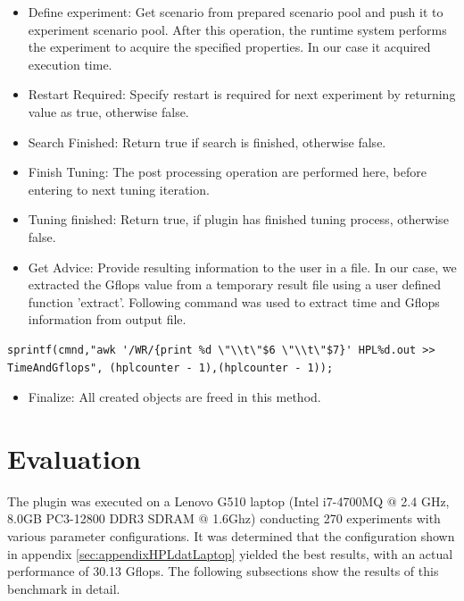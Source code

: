 \documentclass[10pt,twocolumn]{article}
\begin{document}
\begin{itemize}


\item Define experiment: Get scenario from prepared scenario pool and push it to experiment scenario pool. After this operation, the runtime system performs the experiment to acquire the specified properties. In our case it acquired execution time.

\item Restart Required: Specify restart is required for next experiment by returning value as true, otherwise false.

\item Search Finished: Return true if search is finished, otherwise false.

\item Finish Tuning: The post processing operation are performed here, before entering to next tuning iteration.

\item Tuning finished: Return true, if plugin has finished tuning process, otherwise false.

\item Get Advice: Provide resulting information to the user in a file. In our case, we extracted the Gflops value from a temporary result file using a user defined function 'extract'. Following command was used to extract time and Gflops information from output file.
\end{itemize}

\begin{lstlisting}
sprintf(cmnd,"awk '/WR/{print %d \"\\t\"$6 \"\\t\"$7}' HPL%d.out >> TimeAndGflops", (hplcounter - 1),(hplcounter - 1)); 
\end{lstlisting}

\begin{itemize}

\item Finalize: All created objects are freed in this method.

\end{itemize}


\section{Evaluation}
\label{sec:evaluation}
The plugin was executed on a Lenovo G510 laptop (Intel i7-4700MQ $@$ 2.4 GHz, 8.0GB PC3-12800 DDR3 SDRAM $@$ 1.6Ghz) conducting 270 experiments with various parameter configurations. It was determined that the configuration shown in appendix \ref{sec:appendixHPLdatLaptop} yielded the best results, with an actual performance of 30.13 Gflops. The following subsections show the results of this benchmark in detail.
\end{document}
